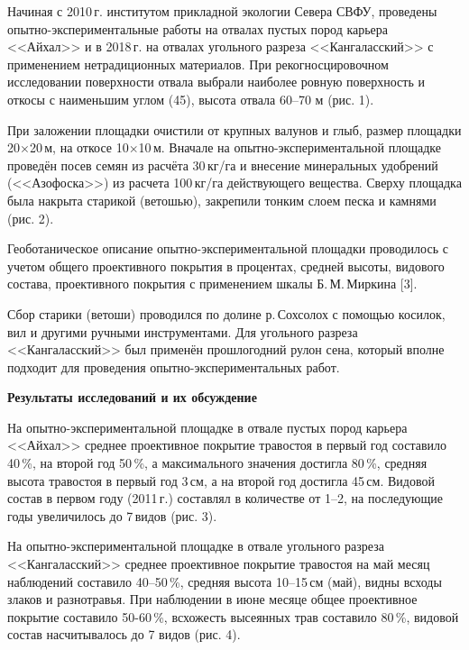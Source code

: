 Начиная с 2010\,г. институтом прикладной экологии Севера СВФУ, проведены опытно-экспериментальные работы на отвалах пустых пород карьера <<Айхал>> и в 2018\,г. на отвалах угольного разреза <<Кангаласский>> с применением нетрадиционных материалов. При рекогносцировочном исследовании поверхности отвала выбрали наиболее ровную поверхность и откосы с наименьшим углом (45\dg), высота отвала 60--70 м (рис. 1).

При заложении площадки очистили от крупных валунов и глыб, размер площадки 20$\times$20\,м, на откосе 10$\times$10\,м. Вначале на опытно-экс\-пе\-ри\-мен\-таль\-ной площадке проведён посев семян из расчёта 30\,кг/га и внесение минеральных удобрений (<<Азофоска>>) из расчета 100\,кг/га действующего вещества. Сверху площадка была накрыта старикой (ветошью), закрепили тонким слоем песка и камнями (рис. 2).

Геоботаническое описание опытно-экспериментальной площадки проводилось с учетом общего проективного покрытия в процентах, средней высоты, видового состава, проективного покрытия с применением шкалы Б.\,М.\,Миркина [3].

Сбор старики (ветоши) проводился по долине р.\,Сохсолох с помощью косилок, вил и другими ручными инструментами. Для угольного разреза <<Кангаласский>> был применён прошлогодний рулон сена, который вполне подходит для проведения опытно-экспериментальных работ.

\textbf{Результаты исследований и их обсуждение}

На опытно-экспериментальной площадке в отвале пустых пород карьера <<Айхал>> среднее проективное покрытие травостоя в первый год составило 40\,\%, на второй год 50\,\%, а максимального значения достигла 80\,\%, средняя высота травостоя в первый год 3\,см, а на второй год достигла 45\,см. Видовой состав в первом году (2011\,г.) составлял в количестве от 1--2, на последующие годы увеличилось до 7\,видов (рис. 3).





На опытно-экспериментальной площадке в отвале угольного разреза <<Кангаласский>> среднее проективное покрытие травостоя на май месяц наблюдений составило 40--50\,\%, средняя высота 10--15\,см (май), видны всходы злаков и разнотравья. При наблюдении в июне месяце общее проективное покрытие составило 50-60\,\%, всхожесть высеянных трав составило 80\,\%, видовой состав насчитывалось до 7 видов (рис. 4).



